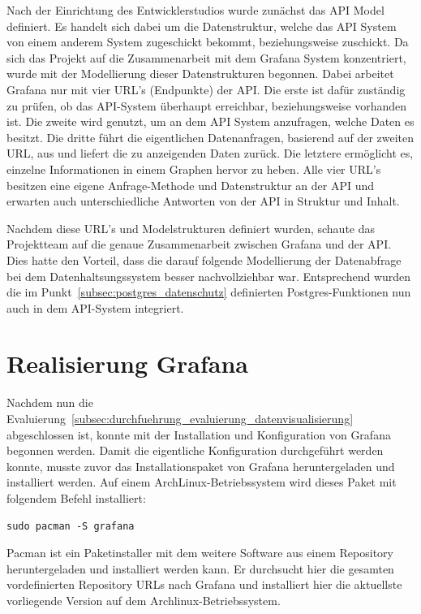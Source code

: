 Nach der Einrichtung des Entwicklerstudios wurde zunächst das API Model
definiert. Es handelt sich dabei um die Datenstruktur, welche das API System
von einem anderem System zugeschickt bekommt, beziehungsweise zuschickt. Da
sich das Projekt auf die Zusammenarbeit mit dem Grafana System konzentriert,
wurde mit der Modellierung dieser Datenstrukturen begonnen. Dabei arbeitet
Grafana nur mit vier URL's (Endpunkte) der API\@. Die erste ist dafür zuständig
zu prüfen, ob das API-System überhaupt erreichbar, beziehungsweise vorhanden
ist. Die zweite wird genutzt, um an dem API System anzufragen, welche Daten es
besitzt. Die dritte führt die eigentlichen Datenanfragen, basierend auf der
zweiten URL, aus und liefert die zu anzeigenden Daten zurück. Die letztere
ermöglicht es, einzelne Informationen in einem Graphen hervor zu heben. Alle
vier URL's besitzen eine eigene Anfrage-Methode und Datenstruktur an der API
und erwarten auch unterschiedliche Antworten von der API in Struktur und
Inhalt.

Nachdem diese URL's und Modelstrukturen definiert wurden, schaute das
Projektteam auf die genaue Zusammenarbeit zwischen Grafana und der API\@. Dies
hatte den Vorteil, dass die darauf folgende Modellierung der Datenabfrage bei
dem Datenhaltsungssystem besser nachvollziehbar war. Entsprechend wurden die
im Punkt~\ref{subsec:postgres_datenschutz} definierten Postgres-Funktionen nun
auch in dem API-System integriert.
\nl%

\section{Realisierung Grafana}
\label{sec:realisierung_grafana}
Nachdem nun die
Evaluierung~\ref{subsec:durchfuehrung_evaluierung_datenvisualisierung}
abgeschlossen ist, konnte mit der Installation und Konfiguration von Grafana
begonnen werden. Damit die eigentliche Konfiguration durchgeführt werden
konnte, musste zuvor das Installationspaket von Grafana heruntergeladen und
installiert werden. Auf einem ArchLinux-Betriebssystem wird dieses Paket mit
folgendem Befehl installiert:

\begin{verbatim}
sudo pacman -S grafana
\end{verbatim}

Pacman ist ein Paketinstaller mit dem weitere Software aus einem Repository
heruntergeladen und installiert werden kann. Er durchsucht hier die gesamten
vordefinierten Repository URLs nach Grafana und installiert hier die aktuellste
vorliegende Version auf dem Archlinux-Betriebssystem.

